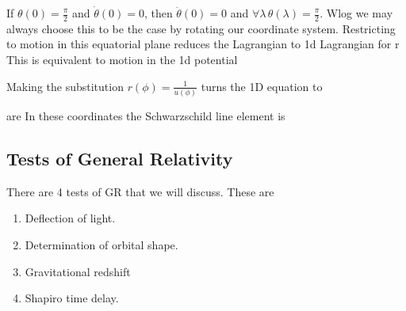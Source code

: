 \documentclass{article}
\begin{document}
\begin{corollary}
If $\theta(0) = \frac{\pi}{2}$ and $\dot{\theta}(0) = 0$, then $\ddot{\theta}(0) = 0$ and $\forall \lambda \,  \theta(\lambda) = \frac{\pi}{2}$. Wlog we may always choose this to be the case by rotating our coordinate system. Restricting to motion in this equatorial plane reduces the Lagrangian to 1d Lagrangian for r 
This is equivalent to motion in the 1d potential 
\end{corollary}

\begin{lemma}
Making the substitution $r(\phi) = \frac{1}{u(\phi)}$ turns the 1D equation to 
\end{lemma}

\begin{definition}
 are 
In these coordinates the Schwarzschild line element is 
\end{definition}

\subsection{Tests of General Relativity}
There are 4 tests of GR that we will discuss. These are 
\begin{enumerate}
    \item Deflection of light.
    \item Determination of orbital shape.
    \item Gravitational redshift
    \item Shapiro time delay.
\end{enumerate}
\end{document}
